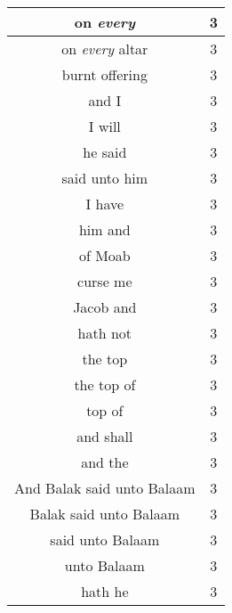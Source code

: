 \begin{center}
\begin{longtable}{|c|c|}
on \emph{every} & 3\\ \hline 
on \emph{every} altar & 3\\ \hline 
burnt offering & 3\\ \hline 
and I & 3\\ \hline 
I will & 3\\ \hline 
he said & 3\\ \hline 
said unto him & 3\\ \hline 
I have & 3\\ \hline 
him and & 3\\ \hline 
of Moab & 3\\ \hline 
curse me & 3\\ \hline 
Jacob and & 3\\ \hline 
hath not & 3\\ \hline 
the top & 3\\ \hline 
the top of & 3\\ \hline 
top of & 3\\ \hline 
and shall & 3\\ \hline 
and the & 3\\ \hline 
And Balak said unto Balaam & 3\\ \hline 
Balak said unto Balaam & 3\\ \hline 
said unto Balaam & 3\\ \hline 
unto Balaam & 3\\ \hline 
hath he & 3\\ \hline 
\end{longtable}
\end{center}





